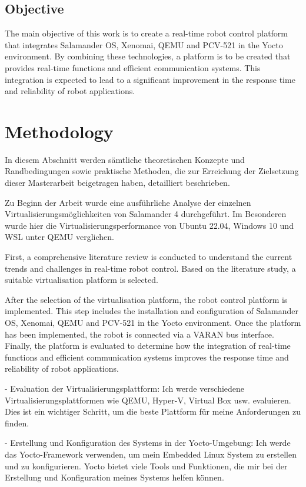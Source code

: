 \documentclass[MMR,Master,english]{twbook}
\begin{document}
\clearpage
\section{Objective}

The main objective of this work is to create a real-time robot control platform that integrates Salamander OS, Xenomai, QEMU and PCV-521 in the Yocto environment. By combining these technologies, a platform is to be created that provides real-time functions and efficient communication systems. This integration is expected to lead to a significant improvement in the response time and reliability of robot applications.


\clearpage
\chapter{Methodology}
 
In diesem Abschnitt werden sämtliche theoretischen Konzepte und Randbedingungen sowie praktische Methoden, die zur Erreichung der Zielsetzung dieser Masterarbeit beigetragen haben, detailliert beschrieben.

Zu Beginn der Arbeit wurde eine ausführliche Analyse der einzelnen Virtualisierungsmöglichkeiten von Salamander 4 durchgeführt. Im Besonderen wurde hier die Virtualisierungsperformance von Ubuntu 22.04, Windows 10 und WSL unter QEMU verglichen.


First, a comprehensive literature review is conducted to understand the current trends and challenges in real-time robot control. Based on the literature study, a suitable virtualisation platform is selected. 


After the selection of the virtualisation platform, the robot control platform is implemented. This step includes the installation and configuration of Salamander OS, Xenomai, QEMU and PCV-521 in the Yocto environment. Once the platform has been implemented, the robot is connected via a VARAN bus interface. Finally, the platform is evaluated to determine how the integration of real-time functions and efficient communication systems improves the response time and reliability of robot applications.

- Evaluation der Virtualisierungsplattform: 
Ich werde verschiedene Virtualisierungsplattformen wie QEMU, Hyper-V, Virtual Box usw. evaluieren. Dies ist ein wichtiger Schritt, um die beste Plattform für meine Anforderungen zu finden.
  
- Erstellung und Konfiguration des Systems in der Yocto-Umgebung: 
Ich werde das Yocto-Framework verwenden, um mein Embedded Linux System zu erstellen und zu konfigurieren. Yocto bietet viele Tools und Funktionen, die mir bei der Erstellung und Konfiguration meines Systems helfen können.
\end{document}
